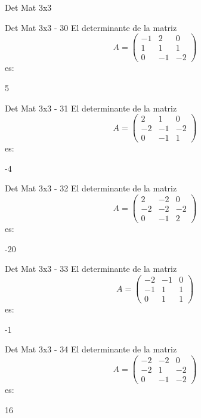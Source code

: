 \documentclass[a4,11pt]{aleph-notas}
\begin{document}
\begin{quiz}{Det Mat 3x3}
\begin{numerical}[tolerance=0]%
    {Det Mat 3x3 - 30}
    El determinante de la matriz
    \[
        A = \begin{pmatrix} -1 & 2 & 0 \\ 1 & 1 & 1 \\ 0 & -1 & -2 \end{pmatrix}
    \]
    es:
    \item[] 5
\end{numerical}

\begin{numerical}[tolerance=0]%
    {Det Mat 3x3 - 31}
    El determinante de la matriz
    \[
        A = \begin{pmatrix} 2 & 1 & 0 \\ -2 & -1 & -2 \\ 0 & -1 & 1 \end{pmatrix}
    \]
    es:
    \item[] -4
\end{numerical}

\begin{numerical}[tolerance=0]%
    {Det Mat 3x3 - 32}
    El determinante de la matriz
    \[
        A = \begin{pmatrix} 2 & -2 & 0 \\ -2 & -2 & -2 \\ 0 & -1 & 2 \end{pmatrix}
    \]
    es:
    \item[] -20
\end{numerical}

\begin{numerical}[tolerance=0]%
    {Det Mat 3x3 - 33}
    El determinante de la matriz
    \[
        A = \begin{pmatrix} -2 & -1 & 0 \\ -1 & 1 & 1 \\ 0 & 1 & 1 \end{pmatrix}
    \]
    es:
    \item[] -1
\end{numerical}

\begin{numerical}[tolerance=0]%
    {Det Mat 3x3 - 34}
    El determinante de la matriz
    \[
        A = \begin{pmatrix} -2 & -2 & 0 \\ -2 & 1 & -2 \\ 0 & -1 & -2 \end{pmatrix}
    \]
    es:
    \item[] 16
\end{numerical}


\end{quiz}
\end{document}
